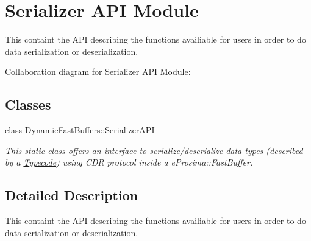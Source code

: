 \hypertarget{group___s_e_r_i_a_l_i_z_e_r_a_p_i_m_o_d_u_l_e}{\section{Serializer A\-P\-I Module}
\label{group___s_e_r_i_a_l_i_z_e_r_a_p_i_m_o_d_u_l_e}
}


This containt the A\-P\-I describing the functions availiable for users in order to do data serialization or deserialization.  


Collaboration diagram for Serializer A\-P\-I Module\-:
\subsection*{Classes}
\begin{DoxyCompactItemize}
\item 
class \hyperlink{class_dynamic_fast_buffers_1_1_serializer_a_p_i}{Dynamic\-Fast\-Buffers\-::\-Serializer\-A\-P\-I}
\begin{DoxyCompactList}\small\item\em This static class offers an interface to serialize/deserialize data types (described by a \hyperlink{class_dynamic_fast_buffers_1_1_typecode}{Typecode}) using C\-D\-R protocol inside a e\-Prosima\-::\-Fast\-Buffer. \end{DoxyCompactList}\end{DoxyCompactItemize}


\subsection{Detailed Description}
This containt the A\-P\-I describing the functions availiable for users in order to do data serialization or deserialization. 